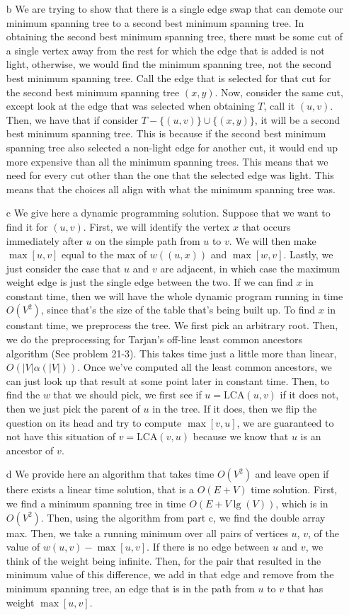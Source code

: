 \documentclass{article}
\begin{document}
\begin{enumerate}
  \item[b] We are trying to show that there is a single edge swap that can demote our minimum spanning tree to a second best minimum spanning tree. In obtaining the second best minimum spanning tree, there must be some cut of a single vertex away from the rest for which the edge that is added is not light, otherwise, we would find the minimum spanning tree, not the second best minimum spanning tree. Call the edge that is selected for that cut for the second best minimum spanning tree $(x, y)$. Now, consider the same cut, except look at the edge that was selected when obtaining $T$, call it $(u, v)$. Then, we have that if consider $T - \{(u, v)\} \cup \{(x, y)\}$, it will be a second best minimum spanning tree. This is because if the second best minimum spanning tree also selected a non-light edge for another cut, it would end up more expensive than all the minimum spanning trees. This means that we need for every cut other than the one that the selected edge was light. This means that the choices all align with what the minimum spanning tree was.
  \item[c] We give here a dynamic programming solution. Suppose that we want to find it for $(u, v)$. First, we will identify the vertex $x$ that occurs immediately after $u$ on the simple path from $u$ to $v$. We will then make $\max[u, v]$ equal to the max of $w((u, x))$ and $\max[w, v]$. Lastly, we just consider the case that $u$ and $v$ are adjacent, in which case the maximum weight edge is just the single edge between the two. If we can find $x$ in constant time, then we will have the whole dynamic program running in time $O(V^2)$, since that's the size of the table that's being built up. To find $x$ in constant time, we preprocess the tree. We first pick an arbitrary root. Then, we do the preprocessing for Tarjan's off-line least common ancestors algorithm (See problem 21-3). This takes time just a little more than linear, $O(|V|\alpha(|V|))$. Once we've computed all the least common ancestors, we can just look up that result at some point later in constant time. Then, to find the $w$ that we should pick, we first see if $u = \text{LCA}(u, v)$ if it does not, then we just pick the parent of $u$ in the tree. If it does, then we flip the question on its head and try to compute $\max[v, u]$, we are guaranteed to not have this situation of $v = \text{LCA}(v, u)$ because we know that $u$ is an ancestor of $v$.
  \item[d] We provide here an algorithm that takes time $O(V^2)$ and leave open if there exists a linear time solution, that is a $O(E + V)$ time solution. First, we find a minimum spanning tree in time $O(E + V \lg(V))$, which is in $O(V^2)$. Then, using the algorithm from part c, we find the double array max. Then, we take a running minimum over all pairs of vertices $u$, $v$, of the value of $w(u, v) - \max[u, v]$. If there is no edge between $u$ and $v$, we think of the weight being infinite. Then, for the pair that resulted in the minimum value of this difference, we add in that edge and remove from the minimum spanning tree, an edge that is in the path from $u$ to $v$ that has weight $\max[u, v]$.
\end{enumerate}
\end{document}
